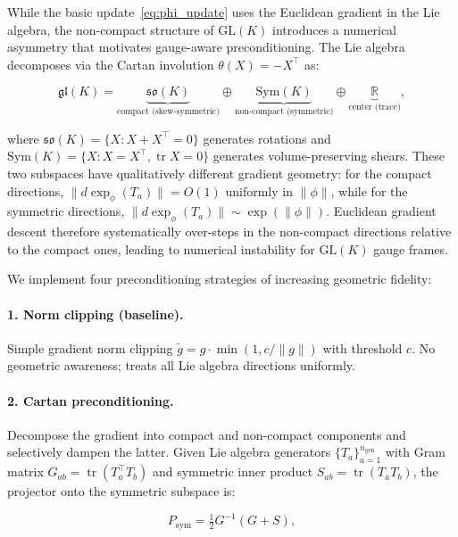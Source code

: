 \documentclass[twoside,11pt]{article}
\begin{document}
While the basic update~\eqref{eq:phi_update} uses the Euclidean gradient in the Lie algebra, the non-compact structure of $\mathrm{GL}(K)$ introduces a numerical asymmetry that motivates gauge-aware preconditioning. The Lie algebra decomposes via the Cartan involution $\theta(X) = -X^\top$ as:

\begin{equation}
\mathfrak{gl}(K) = \underbrace{\mathfrak{so}(K)}_{\text{compact (skew-symmetric)}} \oplus \underbrace{\mathrm{Sym}(K)}_{\text{non-compact (symmetric)}} \oplus \underbrace{\mathbb{R}}_{\text{center (trace)}},
\label{eq:cartan_decomposition}
\end{equation}

where $\mathfrak{so}(K) = \{X : X + X^\top = 0\}$ generates rotations and $\mathrm{Sym}(K) = \{X : X = X^\top, \operatorname{tr} X = 0\}$ generates volume-preserving shears. These two subspaces have qualitatively different gradient geometry: for the compact directions, $\|d\exp_\phi(T_a)\| = O(1)$ uniformly in $\|\phi\|$, while for the symmetric directions, $\|d\exp_\phi(T_a)\| \sim \exp(\|\phi\|)$. Euclidean gradient descent therefore systematically over-steps in the non-compact directions relative to the compact ones, leading to numerical instability for $\mathrm{GL}(K)$ gauge frames.

We implement four preconditioning strategies of increasing geometric fidelity:

\paragraph{1. Norm clipping (baseline).}
Simple gradient norm clipping $\tilde{g} = g \cdot \min(1, c/\|g\|)$ with threshold $c$. No geometric awareness; treats all Lie algebra directions uniformly.

\paragraph{2. Cartan preconditioning.}
Decompose the gradient into compact and non-compact components and selectively dampen the latter. Given Lie algebra generators $\{T_a\}_{a=1}^{n_{\mathrm{gen}}}$ with Gram matrix $G_{ab} = \operatorname{tr}(T_a^\top T_b)$ and symmetric inner product $S_{ab} = \operatorname{tr}(T_a T_b)$, the projector onto the symmetric subspace is:

\begin{equation}
P_{\mathrm{sym}} = \tfrac{1}{2}G^{-1}(G + S),
\end{equation}
\end{document}
